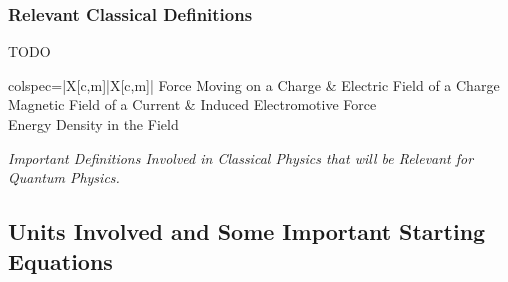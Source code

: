 \documentclass[colorlinks,11pt,a4paper,normalphoto,withhyper,ragged2e]{altareport}
\begin{document}
		
		\subsubsection{Relevant Classical Definitions}
			TODO
			
			\begin{table}[h!]
				\color{body}
				\begin{tblr}{colspec={|X[c,m]|X[c,m]|}}
			    		\hline
					Force Moving on a Charge & Electric Field of a Charge \\
					\hline
					Magnetic Field of a Current & Induced Electromotive Force \\
					\hline
					 Energy Density in the Field \\
					\hline
				\end{tblr}
				\caption{\label{tab:important_definitions_qm}\textit{Important Definitions Involved in Classical Physics that will be Relevant for Quantum Physics.}}
			\end{table}
			
			
			
			\pagebreak
	
	
	
	
	\subsection{Units Involved and Some Important Starting Equations}
		
\end{document}
